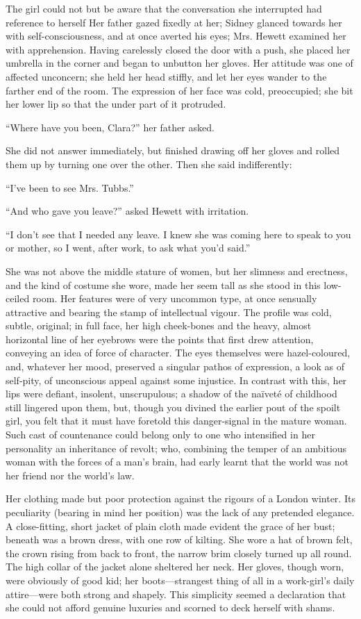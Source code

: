 The girl could not but be aware that the conversation she interrupted
had reference to herself Her father gazed fixedly at her; Sidney glanced
towards her with self-consciousness, and at once averted his eyes;
{}Mrs. Hewett examined her with apprehension. Having carelessly closed
the door with a push, she placed her umbrella in the corner and began to
unbutton her gloves. Her attitude was one of affected unconcern; she
held her head stiffly, and let her eyes wander to the farther end of the
room. The expression of her face was cold, preoccupied; she bit her
lower lip so that the under part of it protruded.

``Where have you been, Clara?'' her father asked.

She did not answer immediately, but finished drawing off her gloves and
rolled them up by turning one over the other. Then she said
indifferently:

``I've been to see Mrs. Tubbs.''

``And who gave you leave?'' asked Hewett with irritation.

``I don't see that I needed any leave. I knew she was coming here to
speak to you or mother, so I went, after work, to ask what you'd said.''

She was not above the middle stature of {}women, but her slimness and
erectness, and the kind of costume she wore, made her seem tall as she
stood in this low-ceiled room. Her features were of very uncommon type,
at once sensually attractive and bearing the stamp of intellectual
vigour. The profile was cold, subtle, original; in full face, her high
cheek-bones and the heavy, almost horizontal line of her eyebrows were
the points that first drew attention, conveying an idea of force of
character. The eyes themselves were hazel-coloured, and, whatever her
mood, preserved a singular pathos of expression, a look as of self-pity,
of unconscious appeal against some injustice. In contrast with this, her
lips were defiant, insolent, unscrupulous; a shadow of the naïveté of
childhood still lingered upon them, but, though you divined the earlier
pout of the spoilt girl, you felt that it must have foretold this
danger-signal in the mature woman. Such cast of countenance could belong
only to one who intensified in her personality an inheritance of revolt;
who, combining the temper of an ambitious woman {}with the forces of a
man's brain, had early learnt that the world was not her friend nor the
world's law.

Her clothing made but poor protection against the rigours of a London
winter. Its peculiarity (bearing in mind her position) was the lack of
any pretended elegance. A close-fitting, short jacket of plain cloth
made evident the grace of her bust; beneath was a brown dress, with one
row of kilting. She wore a hat of brown felt, the crown rising from back
to front, the narrow brim closely turned up all round. The high collar
of the jacket alone sheltered her neck. Her gloves, though worn, were
obviously of good kid; her boots---strangest thing of all in a
work-girl's daily attire---were both strong and shapely. This simplicity
seemed a declaration that she could not afford genuine luxuries and
scorned to deck herself with shams.


